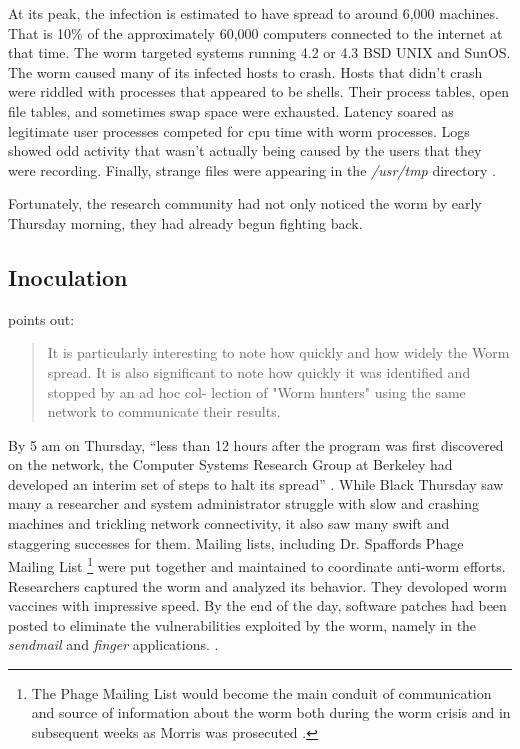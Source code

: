 At its peak, the infection is estimated to have spread to around 6,000 machines.
That is 10\% of the approximately 60,000 computers connected to the internet at
that time\cite{eichin_microscope_1989}\cite{marsan_morris_2008}. The worm
targeted systems running 4.2 or 4.3 BSD UNIX and SunOS. The worm
caused many of its infected hosts to crash.
Hosts that didn't crash were riddled with processes that appeared to be shells.
Their process tables, open file tables, and sometimes swap space were exhausted.
Latency soared as legitimate user processes competed for cpu time with worm
processes. Logs showed odd activity that wasn't actually being caused by the
users that they were recording. Finally, strange files were appearing in the
\textit{/usr/tmp} directory \cite{seeley_tour_1989}\cite{spafford_crisis_1989}.

Fortunately, the research community had not only noticed the worm by early
Thursday morning, they had already begun fighting back.



\subsection*{Inoculation}

\cite{spafford_internet_1989-1} points out:
\begin{quote}
It is particularly interesting to note how quickly and how widely the Worm spread.
It is also significant to note how quickly it was identified and stopped by an ad hoc col-
lection of "Worm hunters" using the same network to communicate their results.
\end{quote}

By 5 am on Thursday, ``less than 12 hours after the program was first discovered on the network, the Computer Systems Research Group at Berkeley had
developed an interim set of steps to halt its spread''
\cite{spafford_crisis_1989}. While Black Thursday saw many a researcher and
system administrator struggle with slow and crashing machines and trickling
network connectivity, it also saw many swift and staggering successes for them.
Mailing lists, including Dr. Spaffords Phage Mailing List
\footnote{
The Phage Mailing List would become the main conduit of communication and source
of information about the worm both during the worm crisis and in subsequent weeks as Morris
was prosecuted
\cite{spafford_crisis_1989}\cite{spafford_internet_1989-1}\cite{lee_washpost_2013}.
} 
were put together and maintained to coordinate anti-worm efforts.
Researchers captured the worm and analyzed its behavior. They devoloped worm
vaccines with impressive speed. By the end of the day, software patches had been posted to
eliminate the vulnerabilities exploited by the worm, namely in the 
\textit{sendmail} and \textit{finger} applications.
\cite{spafford_crisis_1989}
\cite{seeley_tour_1989}.

